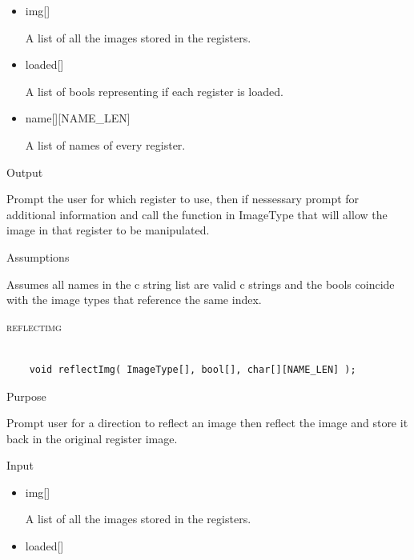 \documentclass[pdftex, 11pt]{article}
\begin{document}
\begin{description}
\begin{description}
\begin{itemize}
					\item{img[]}

						A list of all the images stored in the registers.

					\item{loaded[]}

						A list of bools representing if each register is loaded.

					\item{name[][NAME\_LEN]}

						A list of names of every register.

				\end{itemize}

			\item{Output}

				Prompt the user for which register to use, then if nessessary
				prompt for additional information and call the function
				in ImageType that will allow the image in that register to
				be manipulated.

			\item{Assumptions}

				Assumes all names in the c string list are valid c
				strings and the bools coincide with the image types that
				reference the same index.

		\end{description}



	\item{\textsc{reflectimg}}

		\begin{lstlisting}

	void reflectImg( ImageType[], bool[], char[][NAME_LEN] );
		\end{lstlisting}

		\begin{description}
			\item{Purpose}

				Prompt user for a direction to reflect an image then reflect the image and
				store it back in the original register image.

			\item{Input}

				\begin{itemize}

					\item{img[]}

						A list of all the images stored in the registers.

					\item{loaded[]}


\end{itemize}
\end{description}
\end{description}
\end{document}
